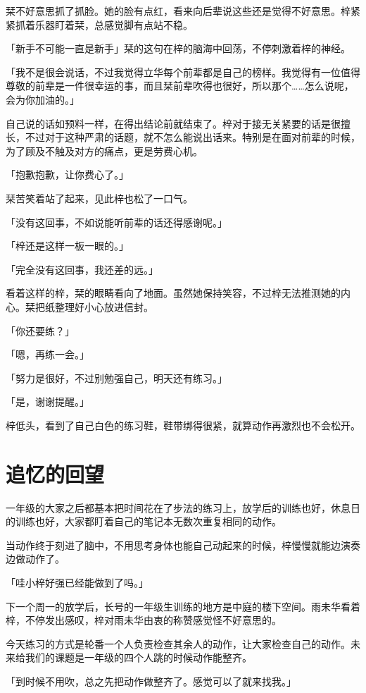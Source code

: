 \documentclass[UTF8]{ctexart}
\begin{document}
    栞不好意思抓了抓脸。她的脸有点红，看来向后辈说这些还是觉得不好意思。梓紧紧抓着乐器盯着栞，总感觉脚有点站不稳。

    「新手不可能一直是新手」栞的这句在梓的脑海中回荡，不停刺激着梓的神经。

    「我不是很会说话，不过我觉得立华每个前辈都是自己的榜样。我觉得有一位值得尊敬的前辈是一件很幸运的事，而且栞前辈吹得也很好，所以那个……怎么说呢，会为你加油的。」

    自己说的话如预料一样，在得出结论前就结束了。梓对于接无关紧要的话是很擅长，不过对于这种严肃的话题，就不怎么能说出话来。特别是在面对前辈的时候，为了顾及不触及对方的痛点，更是劳费心机。

    「抱歉抱歉，让你费心了。」

    栞苦笑着站了起来，见此梓也松了一口气。

    「没有这回事，不如说能听前辈的话还得感谢呢。」

    「梓还是这样一板一眼的。」

    「完全没有这回事，我还差的远。」

    看着这样的梓，栞的眼睛看向了地面。虽然她保持笑容，不过梓无法推测她的内心。栞把纸整理好小心放进信封。

    「你还要练？」

    「嗯，再练一会。」

    「努力是很好，不过别勉强自己，明天还有练习。」

    「是，谢谢提醒。」

    梓低头，看到了自己白色的练习鞋，鞋带绑得很紧，就算动作再激烈也不会松开。
    \section{追忆的回望}
    一年级的大家之后都基本把时间花在了步法的练习上，放学后的训练也好，休息日的训练也好，大家都盯着自己的笔记本无数次重复相同的动作。

    当动作终于刻进了脑中，不用思考身体也能自己动起来的时候，梓慢慢就能边演奏边做动作了。

    「哇小梓好强已经能做到了吗。」

    下一个周一的放学后，长号的一年级生训练的地方是中庭的楼下空间。雨未华看着梓，不停发出感叹，梓对雨未华由衷的称赞感觉怪不好意思的。

    今天练习的方式是轮番一个人负责检查其余人的动作，让大家检查自己的动作。未来给我们的课题是一年级的四个人跳的时候动作能整齐。

    「到时候不用吹，总之先把动作做整齐了。感觉可以了就来找我。」
\end{document}
